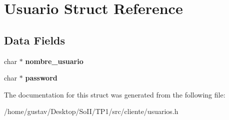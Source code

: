 \hypertarget{struct_usuario}{}\section{Usuario Struct Reference}
\label{struct_usuario}
\subsection*{Data Fields}
\begin{DoxyCompactItemize}
\item 
char $\ast$ {\bfseries nombre\+\_\+usuario}\hypertarget{struct_usuario_ac6fa5c15655b45dfb150c7f27bdbaf52}{}\label{struct_usuario_ac6fa5c15655b45dfb150c7f27bdbaf52}

\item 
char $\ast$ {\bfseries password}\hypertarget{struct_usuario_ad1c15702fe6d2d43545100c8754b327a}{}\label{struct_usuario_ad1c15702fe6d2d43545100c8754b327a}

\end{DoxyCompactItemize}


The documentation for this struct was generated from the following file\+:\begin{DoxyCompactItemize}
\item 
/home/gustav/\+Desktop/\+So\+I\+I/\+T\+P1/src/cliente/usuarios.\+h\end{DoxyCompactItemize}

